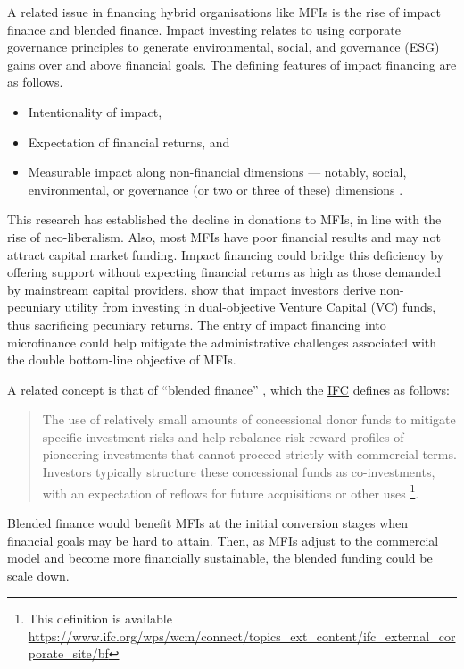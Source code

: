 \documentclass[a4paper, nobind]{templates/ociamthesis}
\begin{document}
A related issue in financing hybrid organisations like MFIs is the rise of impact finance and blended finance. Impact investing relates to using corporate governance principles to generate environmental, social, and governance (ESG) gains over and above financial goals. The defining features of impact financing are as follows.

\begin{itemize}
\item
  Intentionality of impact,
\item
  Expectation of financial returns, and
\item
  Measurable impact along non-financial dimensions --- notably, social, environmental, or governance (or two or three of these) dimensions \autocite{caseau2020impact}.
\end{itemize}

This research has established the decline in donations to MFIs, in line with the rise of neo-liberalism. Also, most MFIs have poor financial results and may not attract capital market funding. Impact financing could bridge this deficiency by offering support without expecting financial returns as high as those demanded by mainstream capital providers. \textcite{barber2021impact} show that impact investors derive non-pecuniary utility from investing in dual-objective Venture Capital (VC) funds, thus sacrificing pecuniary returns. The entry of impact financing into microfinance could help mitigate the administrative challenges associated with the double bottom-line objective of MFIs.

A related concept is that of ``blended finance'' \autocite{attridge2019blended}, which the \href{https://www.ifc.org/wps/wcm/connect/topics_ext_content/ifc_external_corporate_site/bf}{IFC} defines as follows:

\begin{quote}
The use of relatively small amounts of concessional donor funds to mitigate specific investment risks and help rebalance risk-reward profiles of pioneering investments that cannot proceed strictly with commercial terms. Investors typically structure these concessional funds as co-investments, with an expectation of reflows for future acquisitions or other uses \footnote{This definition is available \url{https://www.ifc.org/wps/wcm/connect/topics_ext_content/ifc_external_corporate_site/bf}}.
\end{quote}

Blended finance would benefit MFIs at the initial conversion stages when financial goals may be hard to attain. Then, as MFIs adjust to the commercial model and become more financially sustainable, the blended funding could be scale down.
\end{document}
